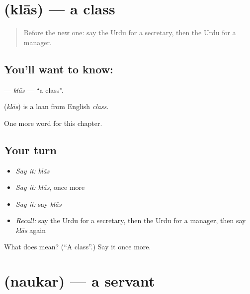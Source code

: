 \section[\texorpdfstring{\ur{کلاس} (klās)}{کلاس (klās)}]{ (klās) — a class}

\label{lesson:UR-C211-klas}



\begin{quote}
Before the new one: say the Urdu for a secretary, then the Urdu for a manager.
\end{quote}

\subsection*{You'll want to know: }
\textbf{} — \emph{klās} — \textquotedblleft{}a class\textquotedblright{}.

\begin{cousinweb}
\textbf{} (\emph{klās}) is a loan from English \emph{class}.
\end{cousinweb}

\begin{grammarlens}[title={What you've built}]
One more word for this chapter.
\end{grammarlens}

\subsection*{Your turn}
\begin{itemize}
\raggedright
  \item \emph{Say it:} \emph{klās}
  \item \emph{Say it:} \emph{klās}, once more
  \item \emph{Say it:} say \emph{klās}
  \item \emph{Recall:} say the Urdu for a secretary, then the Urdu for a manager, then say \emph{klās} again
\end{itemize}

\begin{tcolorbox}[breakable,colback=teal!4,colframe=teal!35!black,title={Before you move on}]
What does  mean? (\textquotedblleft{}A class\textquotedblright{}.) Say it once more.
\end{tcolorbox}
\section[\texorpdfstring{\ur{نوکر} (naukar)}{نوکر (naukar)}]{ (naukar) — a servant}

